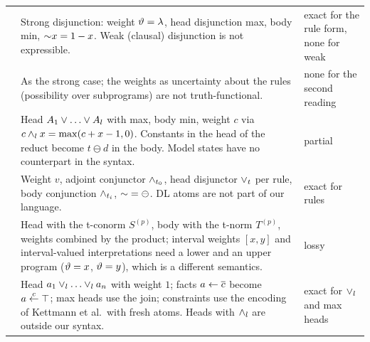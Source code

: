 {\begin{longtable}{@{}p{}p{}p{}@{}}
            \cite{BautersSDV14tplp}                                                                         & Strong disjunction: weight $\vartheta=\lambda$, head disjunction max, body min, $\mathord{\sim} x=1-x$. Weak (clausal) disjunction is not expressible.                                                                                                                    & exact for the rule form, none for weak \\
            \cite{BautersSDV14ijar}                                                                         & As the strong case; the weights as uncertainty about the rules (possibility over subprograms) are not truth-functional.                                                                                                                                             & none for the second reading            \\
            \cite{Lukasiewicz01}                                                                            & Head $A_1\flpor\dots\flpor A_l$ with max, body min, weight $c$ via $c\land_l x=\max(c+x-1,0)$. Constants in the head of the reduct become $t\ominus d$ in the body. Model states have no counterpart in the syntax.                                               & partial                                \\
            \cite{LukasiewiczS07}                                                                           & Weight $v$, adjoint conjunctor $\land_{t_{0}}$, head disjunctor $\lor_t$ per rule, body conjunction $\land_{t_{i}}$, $\mathord{\sim}=\ominus$. DL atoms are not part of our language.                                                                                & exact for rules                        \\
            \cite{Mateis00}                                                                                 & Head with the t-conorm $S^{(p)}$, body with the t-norm $T^{(p)}$, weights combined by the product; interval weights $[x,y]$ and interval-valued interpretations need a lower and an upper program ($\vartheta=x$, $\vartheta=y$), which is a different semantics. & lossy                                  \\
            \cite{MushthofaSD14,MushthofaSD15,MushthofaSD20,BlondeelSVD14}                                  & Head $a_1\lkor\dots\lkor a_n$ with weight $1$; facts $a\leftarrow\overline{c}$ become $a\overset{c}{\gets}\top$; max heads use the join; constraints use the encoding of Kettmann et al.\ with fresh atoms. Heads with $\land_l$ are outside our syntax.                        & exact for $\lor_l$ and max heads     \\

\end{longtable}}
